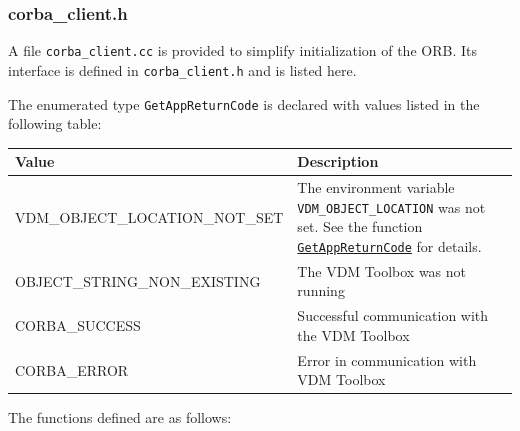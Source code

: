 \documentclass[\pformat,12pt]{article}
\newcommand{\pbs}[1]{\let\temp=\\#1\let\\=\temp}
\begin{document}
\subsubsection{corba\_client.h}

A file \texttt{corba\_client.cc} is provided to simplify
initialization of the ORB. Its interface is defined in 
\texttt{corba\_client.h} and is listed here.

The enumerated type \texttt{GetAppReturnCode} is declared with values
listed in the following table: 

\begin{longtable}{|>{\pbs\raggedright\ttfamily}p{6.6cm}|>{\pbs\raggedright}p{6.6cm}|} \hline
\textrm{\bfseries Value} & \textrm{\bfseries Description}  \\ \hline
  VDM\_OBJECT\_LOCATION\_NOT\_SET
  & The environment variable \texttt{VDM\_OBJECT\_LOCATION} was not
    set. See the function
    \hyperlink{cppclient.GetAppReturnCode}{\texttt{GetAppReturnCode}}
    for details.
\\ \hline
  OBJECT\_STRING\_NON\_EXISTING
  & The VDM Toolbox was not running
\\ \hline
  CORBA\_SUCCESS
  & Successful communication with the VDM Toolbox
\\ \hline
  CORBA\_ERROR
  & Error in communication with VDM Toolbox
\\ \hline
\end{longtable}

The functions defined are as follows:
\end{document}
